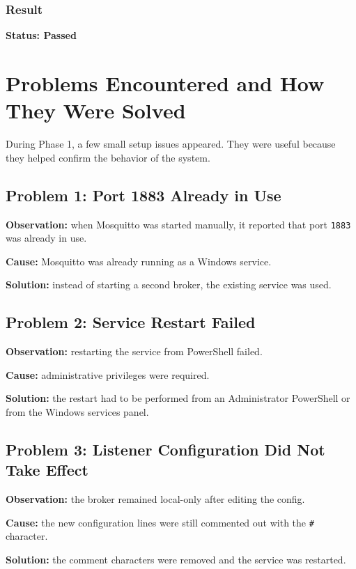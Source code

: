 \documentclass[12pt,a4paper]{article}
\begin{document}
\subsubsection*{Result}

\textbf{Status: Passed}

\section{Problems Encountered and How They Were Solved}

During Phase 1, a few small setup issues appeared. They were useful because
they helped confirm the behavior of the system.

\subsection{Problem 1: Port 1883 Already in Use}

\textbf{Observation:} when Mosquitto was started manually, it reported that
port \texttt{1883} was already in use.

\textbf{Cause:} Mosquitto was already running as a Windows service.

\textbf{Solution:} instead of starting a second broker, the existing service
was used.

\subsection{Problem 2: Service Restart Failed}

\textbf{Observation:} restarting the service from PowerShell failed.

\textbf{Cause:} administrative privileges were required.

\textbf{Solution:} the restart had to be performed from an Administrator
PowerShell or from the Windows services panel.

\subsection{Problem 3: Listener Configuration Did Not Take Effect}

\textbf{Observation:} the broker remained local-only after editing the config.

\textbf{Cause:} the new configuration lines were still commented out with the
\texttt{\#} character.

\textbf{Solution:} the comment characters were removed and the service was
restarted.
\end{document}
